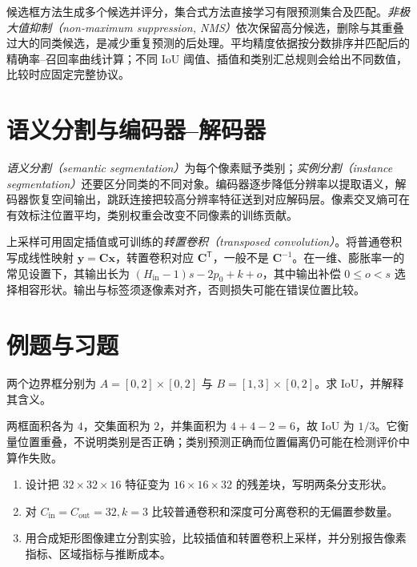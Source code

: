 候选框方法生成多个候选并评分，集合式方法直接学习有限预测集合及匹配。\emph{非极大值抑制（non-maximum suppression, NMS）}依次保留高分候选，删除与其重叠过大的同类候选，是减少重复预测的后处理。平均精度依据按分数排序并匹配后的精确率--召回率曲线计算；不同 IoU 阈值、插值和类别汇总规则会给出不同数值，比较时应固定完整协议。

\section{语义分割与编码器--解码器}
\emph{语义分割（semantic segmentation）}为每个像素赋予类别；\emph{实例分割（instance segmentation）}还要区分同类的不同对象。编码器逐步降低分辨率以提取语义，解码器恢复空间输出，跳跃连接把较高分辨率特征送到对应解码层。像素交叉熵可在有效标注位置平均，类别权重会改变不同像素的训练贡献。

上采样可用固定插值或可训练的\emph{转置卷积（transposed convolution）}。将普通卷积写成线性映射 $\mathbf y=\mathbf C\mathbf x$，转置卷积对应 $\mathbf C^\mathsf T$，一般不是 $\mathbf C^{-1}$。在一维、膨胀率一的常见设置下，其输出长为 $(H_{\mathrm{in}}-1)s-2p_0+k+o$，其中输出补偿 $0\leq o<s$ 选择相容形状。输出与标签须逐像素对齐，否则损失可能在错误位置比较。

\section{例题与习题}
\begin{example}[区域重叠]
两个边界框分别为 $A=[0,2]\times[0,2]$ 与 $B=[1,3]\times[0,2]$。求 IoU，并解释其含义。
\end{example}
\begin{solve}
两框面积各为 $4$，交集面积为 $2$，并集面积为 $4+4-2=6$，故 IoU 为 $1/3$。它衡量位置重叠，不说明类别是否正确；类别预测正确而位置偏离仍可能在检测评价中算作失败。
\end{solve}
\begin{enumerate}
\item 设计把 $32\times32\times16$ 特征变为 $16\times16\times32$ 的残差块，写明两条分支形状。
\item 对 $C_{\mathrm{in}}=C_{\mathrm{out}}=32,k=3$ 比较普通卷积和深度可分离卷积的无偏置参数量。
\item 用合成矩形图像建立分割实验，比较插值和转置卷积上采样，并分别报告像素指标、区域指标与推断成本。
\end{enumerate}

